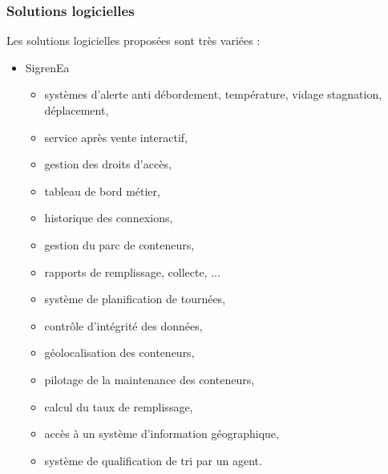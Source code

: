 \documentclass[a4paper,12pt]{report}
\begin{document}
\subsubsection*{Solutions logicielles}
Les solutions logicielles proposées sont très variées :
\begin{itemize}
\item SigrenEa
\begin{itemize}
\item systèmes d'alerte anti débordement, température, vidage stagnation, déplacement,
\item service après vente interactif,
\item gestion des droits d'accès,
\item tableau de bord métier,
\item historique des connexions,
\item gestion du parc de conteneurs,
\item rapports de remplissage, collecte, ...
\item système de planification de tournées,
\item contrôle d'intégrité des données,
\item géolocalisation des conteneurs,
\item pilotage de la maintenance des conteneurs,
\item calcul du taux de remplissage,
\item accès à un système d'information géographique,
\item système de qualification de tri par un agent.


\end{itemize}
\end{itemize}
\end{document}

